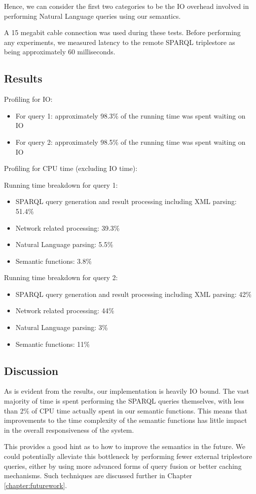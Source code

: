 \documentclass[../main.tex]{subfiles}
\begin{document}
Hence, we can consider the first two categories to be the IO overhead involved in performing Natural Language queries using our semantics.

A 15 megabit cable connection was used during these tests.  Before performing any experiments,
we measured latency to the remote SPARQL triplestore as being approximately 60 milliseconds.

\subsection{Results}

Profiling for IO:

\begin{itemize}
	\item For query 1: approximately 98.3\% of the running time was spent waiting on IO
	\item For query 2: approximately 98.5\% of the running time was spent waiting on IO
\end{itemize}

\noindent Profiling for CPU time (excluding IO time):

\noindent Running time breakdown for query 1:

\begin{itemize}
	\item SPARQL query generation and result processing including XML parsing: 51.4\%
	\item Network related processing: 39.3\%
	\item Natural Language parsing: 5.5\%
	\item Semantic functions: 3.8\%
\end{itemize}

\noindent Running time breakdown for query 2:

\begin{itemize}
	\item SPARQL query generation and result processing including XML parsing: 42\%
	\item Network related processing: 44\%
	\item Natural Language parsing: 3\%
	\item Semantic functions: 11\%
\end{itemize}

\subsection{Discussion}

As is evident from the results, our implementation is heavily IO bound.
The vast majority of time is spent performing the SPARQL queries themselves, with
less than 2\% of CPU time actually spent in our semantic functions.
This means that improvements to the time complexity of the semantic functions has little impact
in the overall responsiveness of the system.

This provides a good hint as to how to improve the semantics in the future.
We could potentially alleviate this bottleneck by performing fewer external triplestore queries,
either by using more advanced forms of query fusion or better caching mechanisms.  Such techniques
are discussed further in Chapter \ref{chapter:futurework}.
\end{document}
